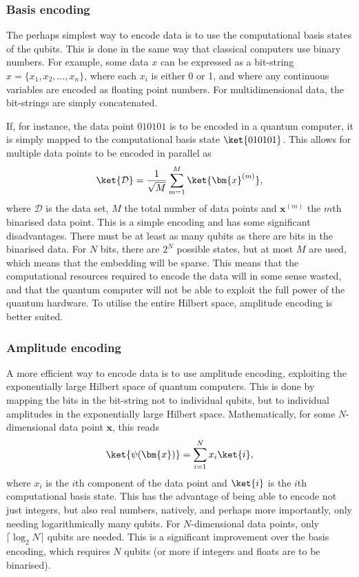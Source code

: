 \subsubsection{Basis encoding}
The perhaps simplest way to encode data is to use the computational basis states of the qubits.
This is done in the same way that classical computers use binary numbers.
For example, some data $x$ can be expressed as a bit-string $x = \{x_1, x_2, \dots, x_n\}$, where each $x_i$ is either 0 or 1, and where any continuous variables are encoded as floating point numbers.
For multidimensional data, the bit-strings are simply concatenated.

If, for instance, the data point $010101$ is to be encoded in a quantum computer, it is simply mapped to the computational basis state $\ket{010101}$.
This allows for multiple data points to be encoded in parallel as
\begin{equation}
  \ket{\mathcal{D}} = \frac{1}{\sqrt M} \sum_{m=1}^M \ket{\bm{x}^{(m)}},
\end{equation}
where $\mathcal{D}$ is the data set, $M$ the total number of data points and $\bm{x}^{(m)}$ the $m$th binarised data point.
This is a simple encoding and has some significant disadvantages.
There must be at least as many qubits as there are bits in the binarised data.
For $N$ bits, there are $2^N$ possible states, but at most $M$ are used, which means that the embedding will be sparse.
This means that the computational resources required to encode the data will in some sense wasted, and that the quantum computer will not be able to exploit the full power of the quantum hardware.
To utilise the entire Hilbert space, amplitude encoding is better suited.

\subsubsection{Amplitude encoding}
A more efficient way to encode data is to use amplitude encoding, exploiting the exponentially large Hilbert space of quantum computers.
This is done by mapping the bits in the bit-string not to individual qubits, but to individual amplitudes in the exponentially large Hilbert space.
Mathematically, for some $N$-dimensional data point $\bm{x}$, this reads
\begin{equation}
  \ket{\psi(\bm{x})} = \sum_{i=1}^{N} x_i \ket{i},
\end{equation}
where $x_i$ is the $i$th component of the data point and $\ket{i}$ is the $i$th computational basis state.
This has the advantage of being able to encode not just integers, but also real numbers, natively, and perhaps more importantly, only needing logarithmically many qubits.
For $N$-dimensional data points, only $\lceil \log_2 N \rceil$ qubits are needed.
This is a significant improvement over the basis encoding, which requires $N$ qubits (or more if integers and floats are to be binarised).

